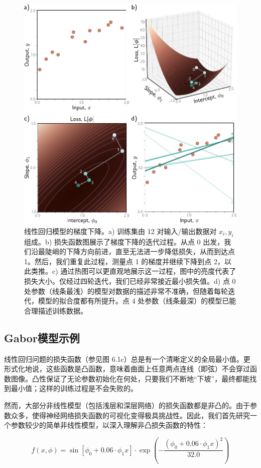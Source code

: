 \documentclass[lang=cn,newtx,10pt,scheme=chinese]{elegantbook}
\begin{document}
\begin{figure}[ht!]
	\centering
	\includegraphics[width=0.7\linewidth]{PDFFigures/UDLChap6PDF/TrainLRMin.pdf}
	\caption{线性回归模型的梯度下降。a) 训练集由 12 对输入/输出数据对 \({x_i , y_i}\) 组成。b) 损失函数图展示了梯度下降的迭代过程。从点 0 出发，我们沿最陡峭的下降方向前进，直至无法进一步降低损失，从而到达点 1。然后，我们重复此过程，测量点 1 的梯度并继续下降到点 2，以此类推。c) 通过热图可以更直观地展示这一过程，图中的亮度代表了损失大小。仅经过四轮迭代，我们已经非常接近最小损失值。d) 点 0 处参数（线条最浅）的模型对数据的描述非常不准确，但随着每轮迭代，模型的拟合度都有所提升。点 4 处参数（线条最深）的模型已能合理描述训练数据。}
\end{figure}

\subsection{Gabor模型示例}
线性回归问题的损失函数（参见图 6.1c）总是有一个清晰定义的全局最小值。更形式化地说，这些函数是凸函数，意味着曲面上任意两点连线（即弦）不会穿过函数图像。凸性保证了无论参数初始化在何处，只要我们不断地“下坡”，最终都能找到最小值；这样的训练过程是不会失败的。

然而，大部分非线性模型（包括浅层和深层网络）的损失函数都是非凸的。由于参数众多，使得神经网络损失函数的可视化变得极具挑战性。因此，我们首先研究一个参数较少的简单非线性模型，以深入理解非凸损失函数的特性：

\begin{equation}
f(x, \phi) = \sin[\phi_0 + 0.06 \cdot \phi_1x] \cdot \exp \left( - \frac{(\phi_0 + 0.06 \cdot \phi_1x)^2}{32.0} \right) 
\end{equation}
\end{document}

